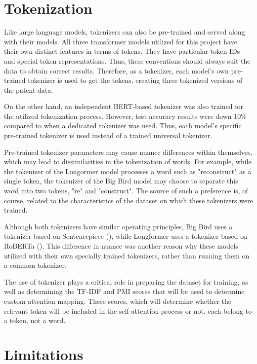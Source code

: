 \documentclass{iyte}
\begin{document}
\section{Tokenization}

Like large language models, tokenizers can also be pre-trained and served along with their models. All three transformer models utilized for this project have their own distinct features in terms of tokens. They have particular token IDs and special token representations. Thus, these conventions should always suit the data to obtain correct results. Therefore, as a tokenizer, each model's own pre-trained tokenizer is used to get the tokens, creating three tokenized versions of the patent data.

On the other hand, an independent BERT-based tokenizer was also trained for the utilized tokenization process. However, test accuracy results were down 10\% compared to when a dedicated tokenizer was used. Thus, each model's specific pre-trained tokenizer is used instead of a trained universal tokenizer.

Pre-trained tokenizer parameters may cause nuance differences within themselves, which may lead to dissimilarities in the tokenization of words. For example, while the tokenizer of the Longormer model processes a word such as "reconstruct" as a single token, the tokenizer of the Big Bird model may choose to separate this word into two tokens, "re" and "construct". The source of such a preference is, of course, related to the characteristics of the dataset on which these tokenizers were trained.

Although both tokenizers have similar operating principles, Big Bird uses a tokenizer based on Sentencepiece (\cite{sentencepiece}), while Longformer uses a tokenizer based on RoBERTa (\cite{RoBERTa}). This difference in nuance was another reason why these models utilized with their own specially trained tokenizers, rather than running them on a common tokenizer.

The use of tokenizer plays a critical role in preparing the dataset for training, as well as determining the TF-IDF and PMI scores that will be used to determine custom attention mapping. These scores, which will determine whether the relevant token will be included in the self-attention process or not, each belong to a token, not a word.

\section{Limitations}
\end{document}
